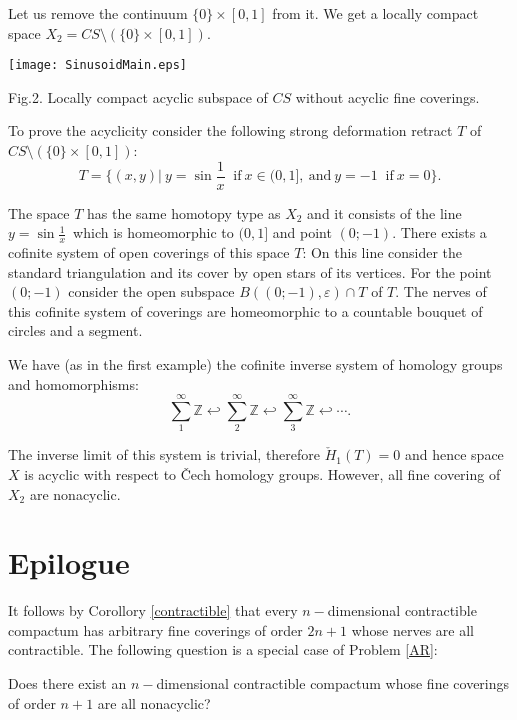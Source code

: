 Let us remove the continuum $\{0\}\times [0, 1]$ from it. We get a
locally compact space $X_2 = CS\setminus (\{0\}\times [0, 1]).$

\begin{center}
\texttt{[image: SinusoidMain.eps]}
\begin{center}\vspace{-3mm}\normalsize{Fig.2. Locally compact acyclic subspace of  $CS$ without acyclic fine  coverings.}\end{center}
\end{center}

\medskip

To prove the acyclicity consider the following strong deformation
retract $T$ of $CS\setminus (\{0\}\times [0, 1])$:
$$T = \{(x, y)|\ y = \sin {\frac{1}{x}}\ \mbox{ if}\ x\in (0, 1],\ \mbox
{and}\ y = -1\ \mbox{ if}\ x = 0 \}.$$

The space $T$ has the same homotopy type as $X_2$ and it consists
of the line $y = \sin {\frac{1}{x}}$\ which is homeomorphic to
$(0, 1]$ and point $(0; -1).$ There exists a cofinite system of
open coverings of this space $T$: On this line consider the
standard triangulation and its cover by open stars of its
vertices. For the point $(0; -1)$ consider the open subspace
$B((0; -1), \varepsilon)\cap T$ of $T.$ The nerves of this
cofinite system of coverings are homeomorphic to a countable
bouquet of circles and a segment.

We have (as in the first example) the cofinite inverse system of
homology groups and homomorphisms:
$$\sum_{1}^{\infty}\mathbb{Z}\hookleftarrow
\sum_{2}^{\infty}\mathbb{Z}\hookleftarrow
\sum_{3}^{\infty}\mathbb{Z}\hookleftarrow \cdots .$$

The inverse limit of this system is trivial, therefore
$\check{H}_1(T) = 0$ and hence space $X$ is acyclic with respect
to {\v C}ech homology groups. However, all fine covering of $X_2$
are nonacyclic.

\section{Epilogue}

It follows by Corollory \ref{contractible}  that every
$n-$dimensional contractible compactum has arbitrary fine
coverings of order $2n+1$ whose nerves  are all contractible.
The following question 
is a special case of Problem
\ref{AR}:

\begin{qws}
Does there exist an $n-$dimensional contractible compactum whose
fine coverings of order $n+1$ are all nonacyclic?
\end{qws}

